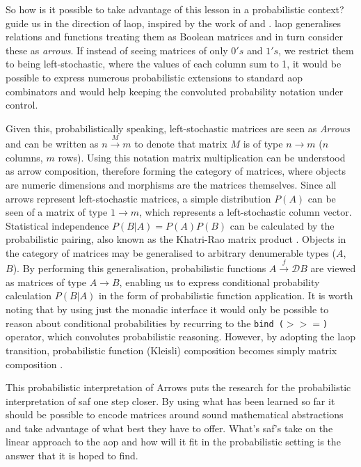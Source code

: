 \documentclass[
  oneside,
  11pt, a4paper,
  footinclude=true,
  headinclude=true,
  cleardoublepage=empty
]{scrbook}
\theoremstyle{definition}
\theoremstyle{definition}
\begin{document}
	        So how is it possible to take advantage of this lesson in a probabilistic context? \cite{Oliveira2016KeepDC} guide us in the direction of \gls{laop}, inspired by the work of \cite{Macedo2012MatricesAA} and \cite{oliveira2012towards}. \gls{laop} generalises relations and functions treating them as Boolean matrices and in turn consider these as \emph{arrows}. If instead of seeing matrices of only $0's$ and $1's$, we restrict them to being left-stochastic, where the values of each column sum to 1, it would be possible to express numerous probabilistic extensions to standard \gls{aop} combinators and would help keeping the convoluted probability notation under control.
	        
	        Given this, probabilistically speaking, left-stochastic matrices are seen as \emph{Arrows} and can be written as $n \xrightarrow{M} m$ to denote that matrix $M$ is of type $n \longrightarrow m$ ($n$ columns, $m$ rows). Using this notation matrix multiplication can be understood as arrow composition, therefore forming the category of matrices, where objects are numeric dimensions and morphisms are the matrices themselves. Since all arrows represent left-stochastic matrices, a simple distribution $P(A)$ can be seen of a matrix of type $1 \longrightarrow m$, which represents a left-stochastic column vector. Statistical independence $P(B|A) = P(A)P(B)$ can be calculated by the probabilistic pairing, also known as the Khatri-Rao matrix product \citep{Macedo2012MatricesAA, murta2013calculating}. Objects in the category of matrices may be generalised to arbitrary denumerable types ($A$, $B$). By performing this generalisation, probabilistic functions $A \xrightarrow{f} \mathscr{D}B$ are viewed as matrices of type $A \longrightarrow B$, enabling us to express conditional probability calculation $P(B|A)$ in the form of probabilistic function application. It is worth noting that by using just the monadic interface it would only be possible to reason about conditional probabilities by recurring to the \texttt{bind ($>>=$)} operator, which convolutes probabilistic reasoning. However, by adopting the \gls{laop} transition, probabilistic function (Kleisli) composition becomes simply matrix composition \citep{oliveira2012towards}.
	        
	        This probabilistic interpretation of Arrows puts the research for the probabilistic interpretation of \gls{saf} one step closer. By using what has been learned so far it should be possible to encode matrices around sound mathematical abstractions and take advantage of what best they have to offer. What's \gls{saf}'s take on the linear approach to the \gls{aop} and how will it fit in the probabilistic setting is the answer that it is hoped to find.
	    
\end{document}
